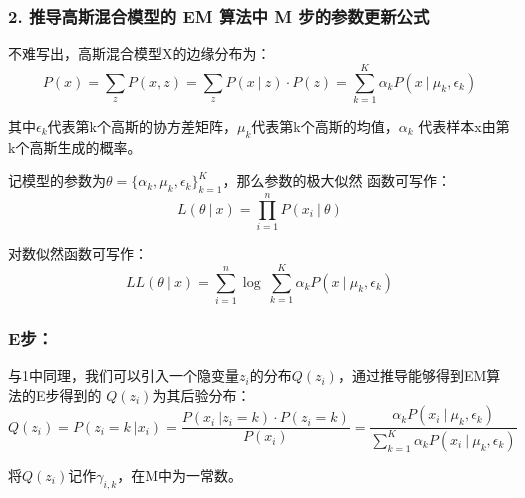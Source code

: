 \documentclass[12pt,a4paper]{article}
\begin{document}
\begin{spacing}{1.3}
\subsubsection*{2. 推导高斯混合模型的 EM 算法中 M 步的参数更新公式}
\par 不难写出，高斯混合模型X的边缘分布为：
$$P(x) = \sum\limits_{z} P(x,z) = \sum\limits_{z} P(x\ | \ z)·P(z) = \sum\limits_{k=1}^{K}
\alpha_{k} P(x \ | \ \mu_{k}, \epsilon_{k}) $$
\par 其中$\epsilon_{k}$代表第k个高斯的协方差矩阵，$\mu_{k}$代表第k个高斯的均值，$\alpha_{k}$
代表样本x由第k个高斯生成的概率。
\par 记模型的参数为$\theta=\{\alpha_{k},\mu_{k},\epsilon_{k} \}_{k=1}^{K}$，那么参数的极大似然
函数可写作：$$L(\theta \ | \ x) = \prod\limits_{i=1}^{n} P(x_{i}\ | \ \theta) $$
\par 对数似然函数可写作：
$$LL(\theta \ | \ x) = \sum\limits_{i=1}^{n} \log \ \sum\limits_{k=1}^{K} \alpha_{k}P(x \ | \ \mu_{k}, \epsilon_{k}) $$
\subsubsection*{E步：}
\par 与1中同理，我们可以引入一个隐变量$z_{i}$的分布$Q(z_{i})$，通过推导能够得到EM算法的E步得到的
$Q(z_{i})$为其后验分布：
$$Q(z_{i})= P(z_{i}=k\ | x_{i})=\dfrac{P(x_{i}\ | z_{i}=k)·P(z_{i}=k)}{P(x_{i})}
=\dfrac{\alpha_{k} P(x_{i} \ | \ \mu_{k}, \epsilon_{k})}{\sum\limits_{k=1}^{K}\alpha_{k} P(x_{i} \ | \ \mu_{k}, \epsilon_{k}) }$$
\par 将$Q(z_{i})$记作$\gamma_{i,k}$，在M中为一常数。

\end{spacing}
\end{document}
